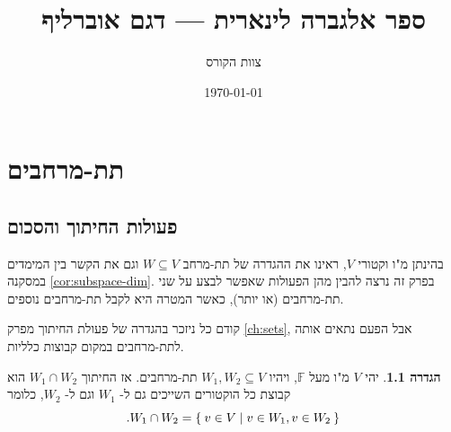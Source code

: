 \documentclass[12pt]{report}
\title{ספר אלגברה לינארית — דגם אוברליף}
\author{צוות הקורס}
\date{\today}
\theoremstyle{plain}
\theoremstyle{definition}
\newtheorem{definition}[theorem]{הגדרה}
\newcommand{\F}{\mathbb{F}}
\newcommand{\0}{\mathbf{0}}
\begin{document}
\maketitle

\chapter{תת-מרחבים}\label{ch:subspaces}

\section{פעולות החיתוך והסכום}

בהינתן מ"ו וקטורי
$V$,
ראינו את ההגדרה של תת-מרחב
$W\subseteq V$
וגם את הקשר בין המימדים במסקנה
\ref{cor:subspace-dim}.
בפרק זה נרצה להבין מהן הפעולות שאפשר לבצע על שני תת-מרחבים (או יותר), כאשר המטרה היא לקבל תת-מרחבים נוספים.

קודם כל ניזכר בהגדרה של פעולת החיתוך מפרק
\ref{ch:sets},
אבל הפעם נתאים אותה לתת-מרחבים במקום קבוצות כלליות.

\begin{definition}
יהי 
$V$
מ"ו מעל
$\F$,
ויהיו 
$W_1,W_2\subseteq V$
תת-מרחבים. אז החיתוך
$W_1\cap W_2$
הוא קבוצת כל הוקטורים השייכים גם ל-
$W_1$
וגם ל-
$W_2$,
כלומר
$$
.W_1\cap W_2=\Set{v\in V|v\in W_1,v\in W_2}
$$
\end{definition}
\end{document}
